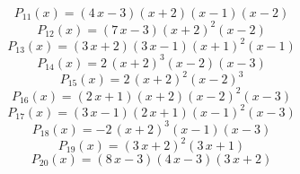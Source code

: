 \subitem \begin{dmath*}P_{11}(x) = {\left(4 \, x - 3\right)} {\left(x + 2\right)} {\left(x - 1\right)} {\left(x - 2\right)} \end{dmath*}\vspace{- 1.20000000000000 cm}
\subitem \begin{dmath*}P_{12}(x) = {\left(7 \, x - 3\right)} {\left(x + 2\right)}^{2} {\left(x - 2\right)} \end{dmath*}\vspace{- 1.20000000000000 cm}
\subitem \begin{dmath*}P_{13}(x) = {\left(3 \, x + 2\right)} {\left(3 \, x - 1\right)} {\left(x + 1\right)}^{2} {\left(x - 1\right)} \end{dmath*}\vspace{- 1.20000000000000 cm}
\subitem \begin{dmath*}P_{14}(x) = 2 \, {\left(x + 2\right)}^{3} {\left(x - 2\right)} {\left(x - 3\right)} \end{dmath*}\vspace{- 1.20000000000000 cm}
\subitem \begin{dmath*}P_{15}(x) = 2 \, {\left(x + 2\right)}^{2} {\left(x - 2\right)}^{3} \end{dmath*}\vspace{- 1.20000000000000 cm}
\subitem \begin{dmath*}P_{16}(x) = {\left(2 \, x + 1\right)} {\left(x + 2\right)} {\left(x - 2\right)}^{2} {\left(x - 3\right)} \end{dmath*}\vspace{- 1.20000000000000 cm}
\subitem \begin{dmath*}P_{17}(x) = {\left(3 \, x - 1\right)} {\left(2 \, x + 1\right)} {\left(x - 1\right)}^{2} {\left(x - 3\right)} \end{dmath*}\vspace{- 1.20000000000000 cm}
\subitem \begin{dmath*}P_{18}(x) = -2 \, {\left(x + 2\right)}^{3} {\left(x - 1\right)} {\left(x - 3\right)} \end{dmath*}\vspace{- 1.20000000000000 cm}
\subitem \begin{dmath*}P_{19}(x) = {\left(3 \, x + 2\right)}^{2} {\left(3 \, x + 1\right)} \end{dmath*}\vspace{- 1.20000000000000 cm}
\subitem \begin{dmath*}P_{20}(x) = {\left(8 \, x - 3\right)} {\left(4 \, x - 3\right)} {\left(3 \, x + 2\right)} \end{dmath*}\vspace{- 1.20000000000000 cm}
